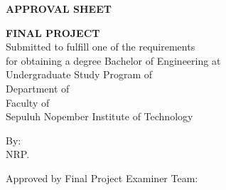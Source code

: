 \begin{center}
  \large
  \textbf{APPROVAL SHEET}
\end{center}

\thispagestyle{empty}

\begin{center}
  \textbf{\engtatitle{}}
\end{center}

\begingroup
\small

\begin{center}
  \textbf{FINAL PROJECT}
  \\Submitted to fulfill one of the requirements \\
  for obtaining a degree Bachelor of Engineering at \\
  Undergraduate Study Program of \engstudyprogram{} \\
  Department of \engdepartment{} \\
  Faculty of \engfaculty{} \\
  Sepuluh Nopember Institute of Technology
\end{center}

\begin{center}
  By: \textbf{\name{}}
  \\NRP. \nrp{}
\end{center}

\begin{center}
  Approved by Final Project Examiner Team:
\end{center}

\begingroup
\setlength{\tabcolsep}{0pt}

